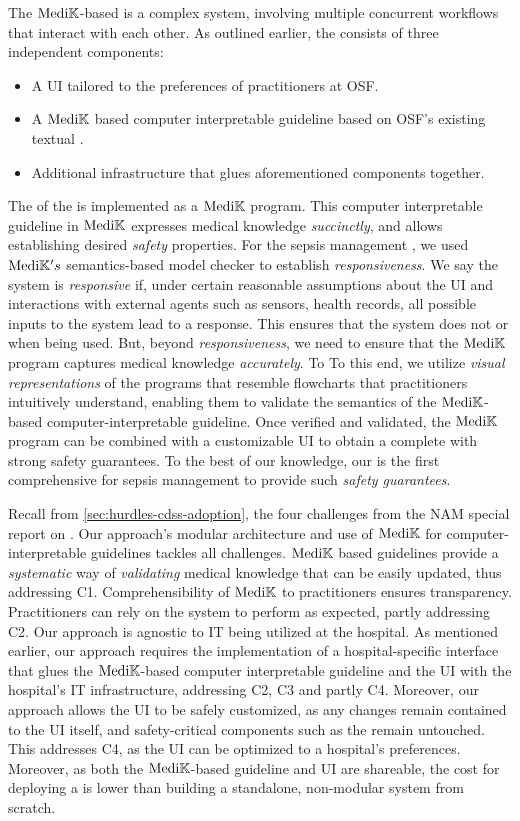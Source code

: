 The $\text{Medi}\mathbb{K}{}$-based \CDSS{} is a complex system, involving multiple
concurrent workflows that interact with each other. As outlined earlier,
the \CDSS{} consists of three independent components:
\begin{itemize}
  \itemsep0.0em
  \item A UI tailored to the preferences of practitioners at OSF.
  \item A $\text{Medi}\mathbb{K}{}{}$ based computer interpretable guideline based on OSF's
    existing textual \BPG{}.
  \item Additional infrastructure that glues aforementioned components together.
\end{itemize}


The \BPGLogic{} of the \CDSS{} is implemented as a $\text{Medi}\mathbb{K}{}{}$ program.
This computer interpretable guideline in $\text{Medi}\mathbb{K}{}$ expresses
medical knowledge \emph{succinctly}, and allows establishing desired \emph{safety} properties.
For the sepsis management \CDSS{}, we used $\text{Medi}\mathbb{K}{}{}'s$ semantics-based model checker to
establish \emph{responsiveness}. We say the system is \emph{responsive} if,
under certain reasonable assumptions about the UI and interactions with external
agents such as sensors, health records, all possible inputs to the
system lead to a response. This ensures that the system does not
 or  when being used. But, beyond \emph{responsiveness},
we need to ensure that the $\text{Medi}\mathbb{K}{}{}$ program captures medical knowledge \emph{accurately}. To
To this end, we utilize \emph{visual representations} of the programs that
resemble flowcharts that practitioners intuitively understand,
enabling them to validate the semantics of the $\text{Medi}\mathbb{K}{}{}$-based
computer-interpretable guideline. Once verified and validated, the $\text{Medi}\mathbb{K}{}{}$ program
can be combined with a customizable UI to obtain a complete \CDSS{} with
strong safety guarantees. To the best of our knowledge, our is the first
comprehensive \CDSSs{} for sepsis management to provide such \emph{safety
guarantees}.

Recall from \autoref{sec:hurdles-cdss-adoption}, the four challenges from
the NAM{} special report on \CDSSs{}. Our approach's modular architecture and
use of $\text{Medi}\mathbb{K}{}{}$ for computer-interpretable guidelines tackles all
challenges. $\text{Medi}\mathbb{K}{}{}$ based guidelines provide a \emph{systematic} way of
\emph{validating} medical knowledge that can be easily updated, thus addressing
C1. Comprehensibility of $\text{Medi}\mathbb{K}{}{}$ to practitioners ensures transparency.
Practitioners can rely on the system to perform as expected, partly addressing C2.
Our approach is agnostic to IT being utilized at the
hospital. As mentioned earlier, our approach requires the implementation
of a hospital-specific interface that glues the $\text{Medi}\mathbb{K}{}{}$-based
computer interpretable guideline and the UI with the hospital's IT
infrastructure, addressing C2, C3 and partly C4. Moreover,
our approach allows the UI to be safely customized,
as any changes remain contained to the UI itself, and safety-critical
components such as the \BPGLogic{} remain untouched. This addresses C4,
as the UI can be optimized to a hospital's preferences. Moreover,
as both the $\text{Medi}\mathbb{K}{}{}$-based guideline and UI are shareable, the cost
for deploying a \CDSS{} is lower than building a standalone,
non-modular system from scratch.


